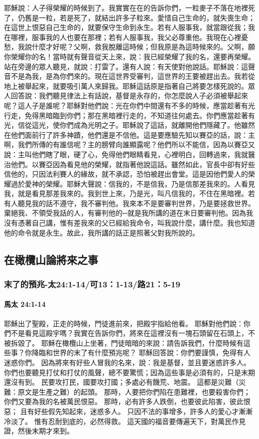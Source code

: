 耶穌說：人子得榮耀的時候到了。我實實在在的告訴你們，一粒麥子不落在地裡死了，仍舊是一粒，若是死了，就結出許多子粒來。愛惜自己生命的，就失喪生命；在這世上恨惡自己生命的，就要保守生命到永生。若有人服事我，就當跟從我；我在哪裡，服事我的人也要在那裡；若有人服事我，我父必尊重他。我現在心裡憂愁，我說什麼才好呢？父啊，救我脫離這時候；但我原是為這時候來的。父啊，願你榮耀你的名！當時就有聲音從天上來，說：我已經榮耀了我的名，還要再榮耀。站在旁邊的眾人聽見，就說：打雷了。還有人說：有天使對他說話。耶穌說：這聲音不是為我，是為你們來的。現在這世界受審判，這世界的王要被趕出去。我若從地上被舉起來，就要吸引萬人來歸我。耶穌這話原是指著自己將要怎樣死說的。眾人回答說：我們聽見律法上有話說，基督是永存的，你怎麼說人子必須被舉起來呢？這人子是誰呢？耶穌對他們說：光在你們中間還有不多的時候，應當趁著有光行走，免得黑暗臨到你們；那在黑暗裡行走的，不知道往何處去。你們應當趁著有光，信從這光，使你們成為光明之子。耶穌說了這話，就離開他們隱藏了。他雖然在他們面前行了許多神蹟，他們還是不信他。這是要應驗先知以賽亞的話，說：主啊，我們所傳的有誰信呢？主的膀臂向誰顯露呢？他們所以不能信，因為以賽亞又說：主叫他們瞎了眼，硬了心，免得他們眼睛看見，心裡明白，回轉過來，我就醫治他們。以賽亞因為看見他的榮耀，就指著他說這話。雖然如此，官長中卻有好些信他的，只因法利賽人的緣故，就不承認，恐怕被趕出會堂。這是因他們愛人的榮耀過於愛神的榮耀。耶穌大聲說：信我的，不是信我，乃是信那差我來的。人看見我，就是看見那差我來的。我到世上來，乃是光，叫凡信我的，不住在黑暗裡。若有人聽見我的話不遵守，我不審判他。我來本不是要審判世界，乃是要拯救世界。棄絕我、不領受我話的人，有審判他的─就是我所講的道在末日要審判他。因為我沒有憑著自己講，惟有差我來的父已經給我命令，叫我說什麼，講什麼。我也知道他的命令就是永生。故此，我所講的話正是照著父對我所說的。
\subsection{在橄欖山論將來之事} 
\subsubsection{末了的預兆-太24:1-14/可13：1-13/路21：5-19}
\paragraph{馬太 24:1-14}
耶穌出了聖殿，正走的時候，門徒進前來，把殿宇指給他看。
耶穌對他們說：你們不是看見這殿宇嗎？我實在告訴你們，將來在這裡沒有一塊石頭留在石頭上，不被拆毀了。
耶穌在橄欖山上坐著，門徒暗暗的來說：請告訴我們，什麼時候有這些事？你降臨和世界的末了有什麼預兆呢？
耶穌回答說：你們要謹慎，免得有人迷惑你們。
因為將來有好些人冒我的名來，說：我是基督，並且要迷惑許多人。
你們也要聽見打仗和打仗的風聲，總不要驚慌；因為這些事是必須有的，只是末期還沒有到。
民要攻打民，國要攻打國；多處必有饑荒、地震。
這都是災難（災難：原文是生產之難）的起頭。
那時，人要把你們陷在患難裡，也要殺害你們；你們又要為我的名被萬民恨惡。
那時，必有許多人跌倒，也要彼此陷害，彼此恨惡；
且有好些假先知起來，迷惑多人。
只因不法的事增多，許多人的愛心才漸漸冷淡了。
惟有忍耐到底的，必然得救。
這天國的福音要傳遍天下，對萬民作見證，然後末期才來到。

